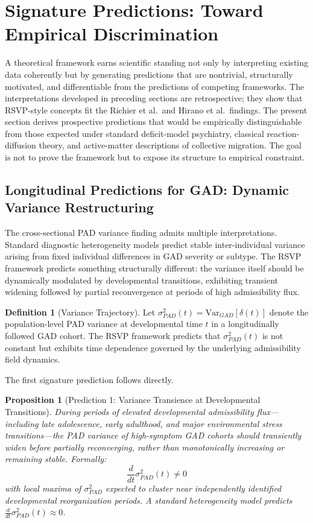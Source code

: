 \documentclass[11pt,a4paper]{article}
\theoremstyle{plain}
\newtheorem{proposition}[theorem]{Proposition}
\theoremstyle{definition}
\newtheorem{definition}[theorem]{Definition}
\begin{document}
\section{Signature Predictions: Toward Empirical Discrimination}
\label{sec:predictions}

A theoretical framework earns scientific standing not only by interpreting existing
data coherently but by generating predictions that are nontrivial, structurally motivated,
and differentiable from the predictions of competing frameworks. The interpretations
developed in preceding sections are retrospective; they show that RSVP-style concepts
fit the Richier et al.\ and Hirano et al.\ findings. The present section derives
prospective predictions that would be empirically distinguishable from those expected
under standard deficit-model psychiatry, classical reaction-diffusion theory, and
active-matter descriptions of collective migration. The goal is not to prove the framework
but to expose its structure to empirical constraint.

\subsection{Longitudinal Predictions for GAD: Dynamic Variance Restructuring}

The cross-sectional PAD variance finding admits multiple interpretations. Standard
diagnostic heterogeneity models predict stable inter-individual variance arising from
fixed individual differences in GAD severity or subtype. The RSVP framework predicts
something structurally different: the variance itself should be dynamically modulated by
developmental transitions, exhibiting transient widening followed by partial reconvergence
at periods of high admissibility flux.

\begin{definition}[Variance Trajectory]
Let $\sigma^2_{PAD}(t) = \mathrm{Var}_{GAD}[\delta(t)]$ denote the population-level
PAD variance at developmental time $t$ in a longitudinally followed GAD cohort. The
RSVP framework predicts that $\sigma^2_{PAD}(t)$ is not constant but exhibits time
dependence governed by the underlying admissibility field dynamics.
\end{definition}

The first signature prediction follows directly.

\begin{proposition}[Prediction 1: Variance Transience at Developmental Transitions]
During periods of elevated developmental admissibility flux---including late adolescence,
early adulthood, and major environmental stress transitions---the PAD variance of
high-symptom GAD cohorts should transiently widen before partially reconverging, rather
than monotonically increasing or remaining stable. Formally:
\[
\frac{d}{dt}\sigma^2_{PAD}(t) \neq 0
\]
with local maxima of $\sigma^2_{PAD}$ expected to cluster near independently identified
developmental reorganization periods. A standard heterogeneity model predicts
$\frac{d}{dt}\sigma^2_{PAD}(t) \approx 0$.
\end{proposition}
\end{document}
